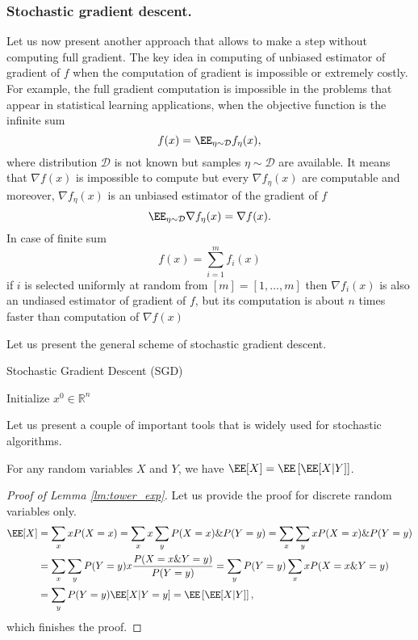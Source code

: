 \subsubsection{Stochastic gradient descent.}
Let us now present another approach that allows to make a step without computing full gradient. The key idea in computing of unbiased estimator of gradient of $f$ when the computation of gradient is impossible or extremely costly. For example, the full gradient computation is impossible in the problems that appear in statistical learning applications, when the objective function is the infinite sum
$$
f(x) = \EE_{\eta\sim\mathcal{D}}f_{\eta}(x),
$$
where distribution $\mathcal{D}$ is not known but samples $\eta\sim\mathcal{D}$ are available. It means that $\nabla f(x)$ is impossible to compute but every $\nabla f_{\eta}(x)$ are computable and moreover, $\nabla f_{\eta}(x)$ is an unbiased estimator of the gradient of $f$
$$
\EE_{\eta\sim\mathcal{D}}\nabla f_{\eta}(x) = \nabla f(x).
$$
In case of finite sum
$$
f(x) = \sum_{i=1}^m f_i(x)
$$
if $i$ is selected uniformly at random from $[m] = [1,\dots,m]$ then $\nabla f_i(x)$ is also an undiased estimator of gradient of $f$, but its computation is about $n$ times faster than computation of $\nabla f(x)$

Let us present the general scheme of stochastic gradient descent.
\begin{algorithm}
    \caption{Stochastic Gradient Descent (SGD)}
    \label{algo:sgd}
    \begin{algorithmic}
        \STATE Initialize $x^0\in\mathbb{R}^n$
        \ENDFOR
    \end{algorithmic}
\end{algorithm}

Let us present a couple of important tools that is widely used for stochastic algorithms.

\begin{lemma}\label{lm:tower_exp}
For any random variables $X$ and $Y$, we have $\EE[X] = \EE\left[\EE[X|Y]\right]$.
\end{lemma}
\begin{proof}[Proof of Lemma \ref{lm:tower_exp}]
    Let us provide the proof for discrete random variables only.
\begin{align}
\EE[X] &= \sum_x x P(X=x) = \sum_x x\sum_yP(X=x)\&P(Y=y) = \sum_x\sum_y x P(X=x)\&P(Y=y)\nonumber\\
&= \sum_x\sum_y P(Y=y)x\frac{P(X=x\&Y=y)}{P(Y = y)}  = \sum_y P(Y=y) \sum_x xP(X=x\&Y=y)\nonumber\\
& = \sum_y P(Y=y) \EE[X|Y=y] = \EE\left[\EE[X|Y]\right],
\end{align}
which finishes the proof.
\end{proof}










